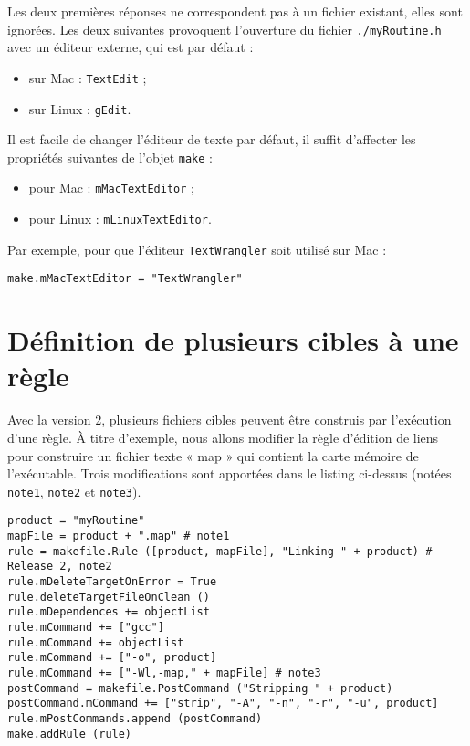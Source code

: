 \documentclass[a4paper,11pt]{extarticle}
\begin{document}
Les deux premières réponses ne correspondent pas à un fichier existant, elles sont ignorées. Les deux suivantes provoquent l'ouverture du fichier \texttt{./myRoutine.h} avec un éditeur externe, qui est par défaut :
\begin{itemize}
\item sur Mac : \texttt{TextEdit} ;
\item sur Linux : \texttt{gEdit}.
\end{itemize}

Il est facile de changer l'éditeur de texte par défaut, il suffit d'affecter les propriétés suivantes de l'objet \texttt{make} :
\begin{itemize}
\item pour Mac : \texttt{mMacTextEditor} ;
\item pour Linux : \texttt{mLinuxTextEditor}.
\end{itemize}

Par exemple, pour que l'éditeur \texttt{TextWrangler} soit utilisé sur Mac :
\begin{lstlisting}[language=Py]
make.mMacTextEditor = "TextWrangler"
\end{lstlisting}





\section{Définition de plusieurs cibles à une règle}\label{plusieursCibles}

Avec la version 2, plusieurs fichiers cibles peuvent être construis par l'exécution d'une règle. À titre d'exemple, nous allons modifier la règle d'édition de liens pour construire un fichier texte « map » qui contient la carte mémoire de l'exécutable. Trois modifications sont apportées dans le listing ci-dessus (notées \texttt{note1}, \texttt{note2} et \texttt{note3}).

\begin{lstlisting}[language=Py]
product = "myRoutine"
mapFile = product + ".map" # note1
rule = makefile.Rule ([product, mapFile], "Linking " + product) # Release 2, note2
rule.mDeleteTargetOnError = True
rule.deleteTargetFileOnClean ()
rule.mDependences += objectList
rule.mCommand += ["gcc"]
rule.mCommand += objectList
rule.mCommand += ["-o", product]
rule.mCommand += ["-Wl,-map," + mapFile] # note3
postCommand = makefile.PostCommand ("Stripping " + product)
postCommand.mCommand += ["strip", "-A", "-n", "-r", "-u", product]
rule.mPostCommands.append (postCommand)
make.addRule (rule)
\end{lstlisting}
\end{document}
